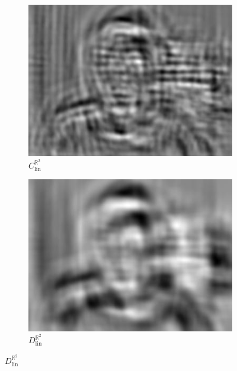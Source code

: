 \documentclass{article}
\begin{document}
\begin{figure}[h!]
\begin{subfigure}[b]{0.1\textwidth}
        \label{fig:mean and std of net24}
    \end{subfigure}
    \hspace{-1\baselineskip}
    \quad
    \begin{subfigure}[b]{0.1\textwidth}   
        \centering 
        \includegraphics[width=\textwidth]{plots/C_lin_R2_conv.jpg}
        \caption{$C_{\text{lin}}^{\mathbb{R}^2}$}%
           
        \label{fig:mean and std of net34}
    \end{subfigure}
    \hspace{-1\baselineskip}
    \quad
    \begin{subfigure}[b]{0.1\textwidth}   
        \centering 
        \includegraphics[width=\textwidth]{plots/D_lin_R2_conv.jpg}
        \caption{$D_{\text{lin}}^{\mathbb{R}^2}$}%
        

\end{subfigure}
\end{figure}
\end{document}
